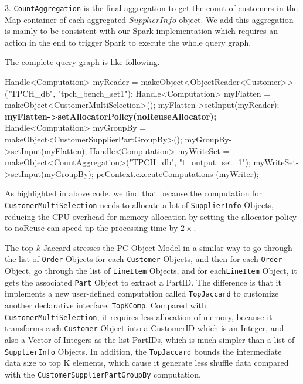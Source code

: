 \vspace{5pt}
3. \texttt{CountAggregation} is the final aggregation to get the count of customers in the Map
container of each aggregated $SupplierInfo$ object. We add this
aggregation is mainly to be consistent with our Spark implementation
which requires an action in the end to trigger Spark to execute the
whole query graph.

\vspace{5pt}
The complete query graph is like following. 

\begin{code}
    Handle<Computation> myReader = 
        makeObject<ObjectReader<Customer>>("TPCH_db", "tpch_bench_set1");
    Handle<Computation> myFlatten = makeObject<CustomerMultiSelection>();
    myFlatten->setInput(myReader);
    {\bf myFlatten->setAllocatorPolicy(noReuseAllocator);}
    Handle<Computation> myGroupBy = makeObject<CustomerSupplierPartGroupBy>();
    myGroupBy->setInput(myFlatten);
    Handle<Computation> myWriteSet = 
        makeObject<CountAggregation>("TPCH_db", "t_output_set_1");
    myWriteSet->setInput(myGroupBy);
    pcContext.executeComputations (myWriter);
\end{code}

As highlighted in above code,  we find
that because the computation for \texttt{CustomerMultiSelection} needs
to allocate a lot of \texttt{SupplierInfo} Objects, reducing the CPU
overhead for memory allocation by setting the allocator policy to
noReuse can speed up the processing time by $2\times$.

\vspace{5pt}
The top-$k$ Jaccard stresses the PC Object Model in a similar way to
go through the list of \texttt{Order} Objects for each
\texttt{Customer} Objects, and then for each \texttt{Order} Object, go
through the list of \texttt{LineItem} Objects, and for
each\texttt{LineItem} Object, it gets the associated \texttt{Part}
Object to extract a PartID. 
The difference is that it implements a new user-defined computation
called \texttt{TopJaccard} to customize another declarative interface,
\texttt{TopKComp}. Compared with \texttt{CustomerMultiSelection}, it
requires less allocation of memory, because it transforms each
\texttt{Customer} Object into a CustomerID which is an Integer, and
also a Vector of Integers as the list PartIDs, which is much simpler
than a list of  \texttt{SupplierInfo} Objects. In addition, the
\texttt{TopJaccard} bounds the intermediate data size to top K
elements, which cause it generate less shuffle data compared with the
\texttt{CustomerSupplierPartGroupBy} computation.


